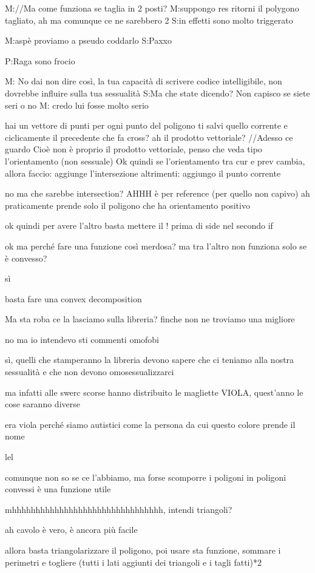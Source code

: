 
M://Ma come funziona se taglia in 2 posti?
M:suppongo res ritorni il polygono tagliato, ah ma comunque ce ne sarebbero 2
S:in effetti sono molto triggerato

M:aspè proviamo a pseudo coddarlo
S:Paxxo

P:Raga sono frocio

M: No dai non dire così, la tua capacità di scrivere codice intelligibile, non dovrebbe influire sulla tua sessualità
S:Ma che state dicendo? Non capisco se siete seri o no
M: credo lui fosse molto serio

hai un vettore di punti
per ogni punto del poligono ti salvi quello corrente e ciclicamente il precedente
che fa cross? ah il prodotto vettoriale? //Adesso ce guardo
Cioè non è proprio il prodotto vettoriale, penso che veda tipo l'orientamento (non sessuale)
Ok quindi se l'orientamento tra cur e prev cambia, allora faccio:
    aggiunge l'intersezione 
altrimenti:
    aggiungo il punto corrente

no ma che sarebbe intersection? AHHH è per reference (per quello non capivo)
ah praticamente prende solo il poligono che ha orientamento positivo

ok quindi per avere l'altro basta mettere il ! prima di side nel secondo if

ok ma perché fare una funzione così merdosa?
ma tra l'altro non funziona solo se è convesso?

sì

basta fare una convex decomposition

Ma sta roba ce la lasciamo sulla libreria? finche non ne troviamo una migliore

no ma io intendevo sti commenti omofobi

sì, quelli che stamperanno la libreria devono sapere che ci teniamo alla nostra sessualità e che non devono omosessualizzarci

ma infatti alle swerc scorse hanno distribuito le magliette VIOLA, quest'anno le cose saranno diverse

era viola perché siamo autistici come la persona da cui questo colore prende il nome

lel

comunque non so se ce l'abbiamo, ma forse scomporre i poligoni in poligoni convessi è una funzione utile

mhhhhhhhhhhhhhhhhhhhhhhhhhhhhhhhh, intendi triangoli?

ah cavolo è vero, è ancora più facile

allora basta triangolarizzare il poligono, poi usare sta funzione, sommare i perimetri e togliere (tutti i lati aggiunti dei triangoli e i tagli fatti)*2

